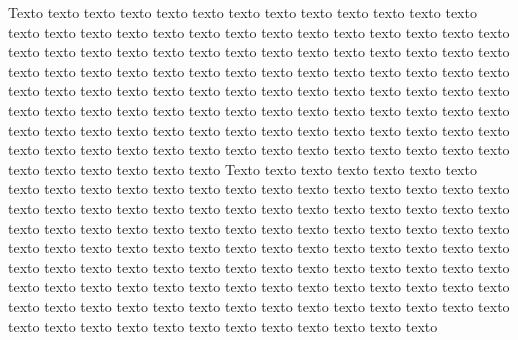 Texto texto texto texto texto texto texto texto texto texto texto texto texto
texto texto texto texto texto texto texto texto texto texto texto texto texto
texto texto texto texto texto texto texto texto texto texto texto texto texto
texto texto texto texto texto texto texto texto texto texto texto texto texto
texto texto texto texto texto texto texto texto texto texto texto texto texto 
texto texto texto texto texto texto texto texto texto texto texto texto texto 
texto texto texto texto texto texto texto texto texto texto texto texto texto 
texto texto texto texto texto texto texto texto texto texto texto texto texto 
texto texto texto texto texto texto texto texto texto texto texto texto texto
Texto texto texto texto texto texto texto texto texto texto texto texto texto
texto texto texto texto texto texto texto texto texto texto texto texto texto
texto texto texto texto texto texto texto texto texto texto texto texto texto
texto texto texto texto texto texto texto texto texto texto texto texto texto
texto texto texto texto texto texto texto texto texto texto texto texto texto 
texto texto texto texto texto texto texto texto texto texto texto texto texto 
texto texto texto texto texto texto texto texto texto texto texto texto texto 
texto texto texto texto texto texto texto texto texto texto texto texto texto 
texto texto texto texto texto texto texto texto texto texto texto texto texto


